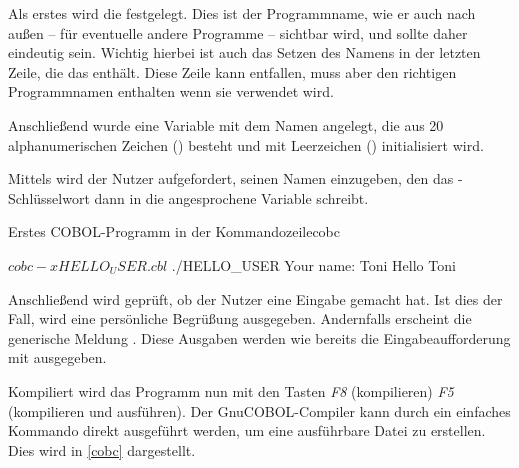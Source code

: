 Als erstes wird die  festgelegt. Dies ist der Programmname, wie er auch nach außen -- für eventuelle andere Programme -- sichtbar wird, und sollte daher eindeutig sein. Wichtig hierbei ist auch das Setzen des Namens in der letzten Zeile, die das  enthält. Diese Zeile kann entfallen, muss aber den richtigen Programmnamen enthalten wenn sie verwendet wird.

Anschließend wurde eine Variable mit dem Namen  angelegt, die aus 20 alphanumerischen Zeichen () besteht und mit Leerzeichen () initialisiert wird.

Mittels  wird der Nutzer aufgefordert, seinen Namen einzugeben, den das -Schlüsselwort dann in die angesprochene Variable schreibt.

\begin{codeWithCaption}{Erstes COBOL-Programm in der Kommandozeile}{cobc}
    \begin{shellwindow}
    $ cobc -x HELLO_USER.cbl
    $ ./HELLO_USER
    Your name: Toni
    Hello Toni
    \end{shellwindow}
\end{codeWithCaption}

Anschließend wird geprüft, ob der Nutzer eine Eingabe gemacht hat. Ist dies der Fall, wird eine persönliche Begrüßung ausgegeben. Andernfalls erscheint die generische Meldung . Diese Ausgaben werden wie bereits die Eingabeaufforderung mit  ausgegeben.

Kompiliert wird das Programm nun mit den Tasten \textit{F8} (kompilieren) \bzw \textit{F5} (kompilieren und ausführen). Der GnuCOBOL-Compiler kann durch ein einfaches Kommando direkt ausgeführt werden, um eine ausführbare Datei zu erstellen. Dies wird in \autoref{cobc} dargestellt.